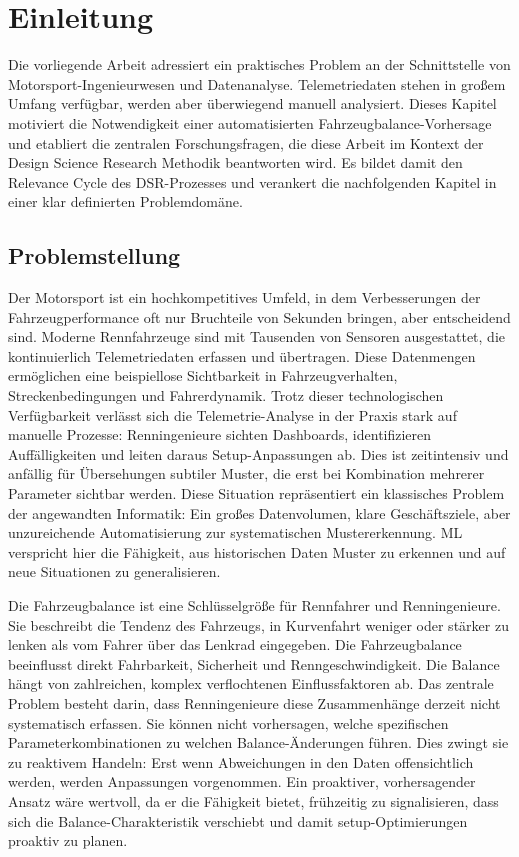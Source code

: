 \chapter{Einleitung}
Die vorliegende Arbeit adressiert ein praktisches Problem an der Schnittstelle von Motorsport-Ingenieurwesen und Datenanalyse. Telemetriedaten stehen in großem Umfang verfügbar, werden aber überwiegend manuell analysiert. Dieses Kapitel motiviert die Notwendigkeit einer automatisierten Fahrzeugbalance-Vorhersage und etabliert die zentralen Forschungsfragen, die diese Arbeit im Kontext der Design Science Research Methodik beantworten wird. Es bildet damit den Relevance Cycle des \ac{DSR}-Prozesses und verankert die nachfolgenden Kapitel in einer klar definierten Problemdomäne.

\section{Problemstellung}

Der Motorsport ist ein hochkompetitives Umfeld, in dem Verbesserungen der Fahrzeugperformance oft nur Bruchteile von Sekunden bringen, aber entscheidend sind. Moderne Rennfahrzeuge sind mit Tausenden von Sensoren ausgestattet, die kontinuierlich Telemetriedaten erfassen und übertragen. Diese Datenmengen ermöglichen eine beispiellose Sichtbarkeit in Fahrzeugverhalten, Streckenbedingungen und Fahrerdynamik. Trotz dieser technologischen Verfügbarkeit verlässt sich die Telemetrie-Analyse in der Praxis stark auf manuelle Prozesse: Renningenieure sichten Dashboards, identifizieren Auffälligkeiten und leiten daraus Setup-Anpassungen ab. Dies ist zeitintensiv und anfällig für Übersehungen subtiler Muster, die erst bei Kombination mehrerer Parameter sichtbar werden.
Diese Situation repräsentiert ein klassisches Problem der angewandten Informatik: Ein großes Datenvolumen, klare Geschäftsziele, aber unzureichende Automatisierung zur systematischen Mustererkennung. \ac{ML} verspricht hier die Fähigkeit, aus historischen Daten Muster zu erkennen und auf neue Situationen zu generalisieren.

Die Fahrzeugbalance ist eine Schlüsselgröße für Rennfahrer und Renningenieure. Sie beschreibt die Tendenz des Fahrzeugs, in Kurvenfahrt weniger oder stärker zu lenken als vom Fahrer über das Lenkrad eingegeben. Die Fahrzeugbalance beeinflusst direkt Fahrbarkeit, Sicherheit und Renngeschwindigkeit. Die Balance hängt von zahlreichen, komplex verflochtenen Einflussfaktoren ab.
Das zentrale Problem besteht darin, dass Renningenieure diese Zusammenhänge derzeit nicht systematisch erfassen. Sie können nicht vorhersagen, welche spezifischen Parameterkombinationen zu welchen Balance-Änderungen führen. Dies zwingt sie zu reaktivem Handeln: Erst wenn Abweichungen in den Daten offensichtlich werden, werden Anpassungen vorgenommen. Ein proaktiver, vorhersagender Ansatz wäre wertvoll, da er die Fähigkeit bietet, frühzeitig zu signalisieren, dass sich die Balance-Charakteristik verschiebt und damit setup-Optimierungen proaktiv zu planen.

